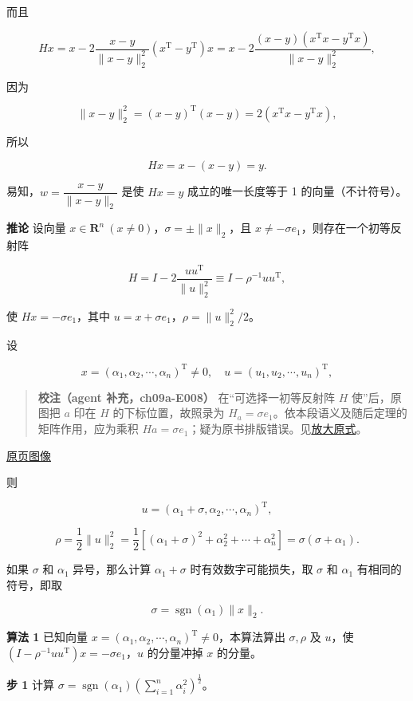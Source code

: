 \documentclass[
  10pt,
  fontset=fandol]{ctexart}
\begin{document}
而且

\[
Hx=x-2\frac{x-y}{\|x-y\|_2^2}(x^{\mathrm T}-y^{\mathrm T})x=x-2\frac{(x-y)(x^{\mathrm T}x-y^{\mathrm T}x)}{\|x-y\|_2^2},
\]

因为

\[
\|x-y\|_2^2=(x-y)^{\mathrm T}(x-y)=2(x^{\mathrm T}x-y^{\mathrm T}x),
\]

所以

\[
Hx=x-(x-y)=y.
\]

易知，\(w=\dfrac{x-y}{\|x-y\|_2}\) 是使 \(Hx=y\) 成立的唯一长度等于 1 的向量（不计符号）。

\textbf{推论} 设向量 \(x\in\mathbf R^n\ (x\ne0)\)，\(\sigma=\pm\|x\|_2\)，且 \(x\ne-\sigma e_1\)，则存在一个初等反射阵

\[
H=I-2\frac{uu^{\mathrm T}}{\|u\|_2^2}\equiv I-\rho^{-1}uu^{\mathrm T},
\]

使 \(Hx=-\sigma e_1\)，其中 \(u=x+\sigma e_1\)，\(\rho=\|u\|_2^2/2\)。

设

\[
x=(\alpha_1,\alpha_2,\cdots,\alpha_n)^{\mathrm T}\ne0,\quad u=(u_1,u_2,\cdots,u_n)^{\mathrm T},
\]

\begin{quote}
\textbf{校注（agent 补充，ch09a-E008）} 在``可选择一初等反射阵 \(H\) 使''后，原图把 \(a\) 印在 \(H\) 的下标位置，故照录为 \(H_a=\sigma e_1\)。依本段语义及随后定理的矩阵作用，应为乘积 \(Ha=\sigma e_1\)；疑为原书排版错误。见\href{../assets/ch09a/review-p244-Ha.png}{放大原式}。
\end{quote}

\href{../../source-images/pdf-245.jpeg}{原页图像}

则

\[
u=(\alpha_1+\sigma,\alpha_2,\cdots,\alpha_n)^{\mathrm T},
\]

\[
\rho=\frac12\|u\|_2^2=\frac12\left[(\alpha_1+\sigma)^2+\alpha_2^2+\cdots+\alpha_n^2\right]=\sigma(\sigma+\alpha_1).
\]

如果 \(\sigma\) 和 \(\alpha_1\) 异号，那么计算 \(\alpha_1+\sigma\) 时有效数字可能损失，取 \(\sigma\) 和 \(\alpha_1\) 有相同的符号，即取

\[
\sigma=\operatorname{sgn}(\alpha_1)\|x\|_2.
\]

\textbf{算法 1} 已知向量 \(x=(\alpha_1,\alpha_2,\cdots,\alpha_n)^{\mathrm T}\ne0\)，本算法算出 \(\sigma,\rho\) 及 \(u\)，使 \((I-\rho^{-1}uu^{\mathrm T})x=-\sigma e_1\)，\(u\) 的分量冲掉 \(x\) 的分量。

\textbf{步 1} 计算 \(\sigma=\operatorname{sgn}(\alpha_1)\left(\displaystyle\sum_{i=1}^n\alpha_i^2\right)^{\frac12}\)。
\end{document}
